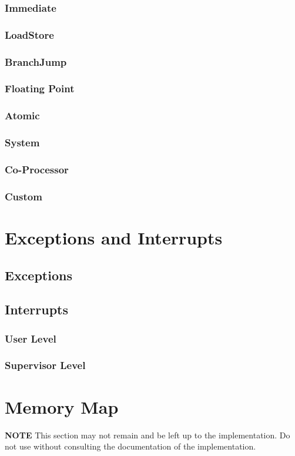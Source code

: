 \documentclass[letterpaper]{article}
\begin{document}
\subsubsection{Immediate}
\subsubsection{Load\/Store}
\subsubsection{Branch\/Jump}
\subsubsection{Floating Point}
\subsubsection{Atomic}
\subsubsection{System}
\subsubsection{Co-Processor}
\subsubsection{Custom}


\section{Exceptions and Interrupts}
\subsection{Exceptions}


\subsection{Interrupts}
\subsubsection{User Level}
\subsubsection{Supervisor Level}


\section{Memory Map}
\textbf{NOTE}
This section may not remain and be left up to the implementation. Do not use without consulting
the documentation of the implementation.
\end{document}

